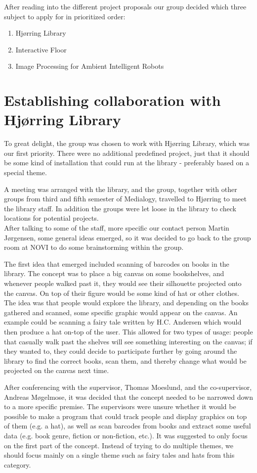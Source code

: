 After reading into the different project proposals our group decided which three subject to apply for in prioritized order:

\begin{enumerate} 
\item Hj{\o}rring Library 
\item Interactive Floor 
\item Image Processing for Ambient Intelligent Robots 
\end{enumerate}

\section{Establishing collaboration with Hj{\o}rring Library}
To great delight, the group was chosen to work with Hj{\o}rring Library, which was our first priority. There were no additional predefined project, just that it should be some kind of installation that could run at the library - preferably based on a special theme.

A meeting was arranged with the library, and the group, together with other groups from third and fifth semester of Medialogy, travelled to Hj{\o}rring to meet the library staff. In addition the groups were let loose in the library to check locations for potential projects.\\
After talking to some of the staff, more specific our contact person Martin J{\o}rgensen, some general ideas emerged, so it was decided to go back to the group room at NOVI to do some brainstorming within the group.

The first idea that emerged included scanning of barcodes on books in the library. The concept was to place a big canvas on some bookshelves, and whenever people walked past it, they would see their silhouette projected onto the canvas. On top of their figure would be some kind of hat or other clothes. The  idea was that people would explore the library, and depending on the books gathered and scanned, some specific graphic would appear on the canvas. An example could be scanning a fairy tale written by H.C. Andersen which would then produce a hat on-top of the user. This allowed for two types of usage: people that casually walk past the shelves will see something interesting on the canvas; if they wanted to, they could decide to participate further by going around the library to find the correct books, scan them, and thereby change what would be projected on the canvas next time.

After conferencing with the supervisor, Thomas Moeslund, and the co-supervisor, Andreas M{\o}gelmose, it was decided that the concept needed to be narrowed down to a more specific premise. The supervisors were unsure whether it would be possible to make a program that could  track people and display graphics on top of them (e.g. a hat), as well as scan barcodes from books and extract some useful data (e.g. book genre, fiction or non-fiction, etc.). It was suggested to only focus on the first part of the concept. Instead of trying to do multiple themes, we should focus mainly on a single theme such as fairy tales and hats from this category.

